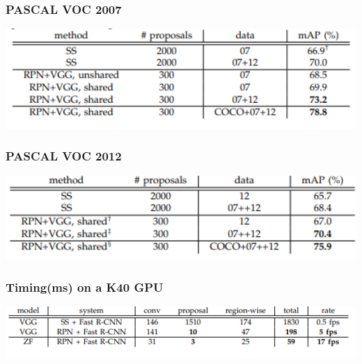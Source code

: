 \documentclass{beamer}
\begin{document}
    \begin{frame}
       \frametitle{PASCAL VOC 2007}
       \centering
         \includegraphics[width=1.0\textwidth]{images/t1.PNG}
    \end{frame}
    
    \begin{frame}
       \frametitle{PASCAL VOC 2012}
       \centering
         \includegraphics[width=1.0\textwidth]{images/t2.PNG}
    \end{frame}
    
    \begin{frame}
       \frametitle{Timing(ms) on a K40 GPU}
       \centering
         \includegraphics[width=1.0\textwidth]{images/t3.PNG}
    \end{frame}
    
    
    
    
\end{document}
